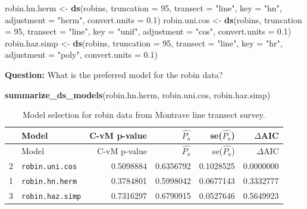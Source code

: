 \documentclass[10pt,a4paper]{tufte-handout}
\newenvironment{Shaded}{\begin{snugshade}}{\end{snugshade}}
\newcommand{\DataTypeTok}[1]{\textcolor[rgb]{0.13,0.29,0.53}{#1}}
\newcommand{\DecValTok}[1]{\textcolor[rgb]{0.00,0.00,0.81}{#1}}
\newcommand{\FloatTok}[1]{\textcolor[rgb]{0.00,0.00,0.81}{#1}}
\newcommand{\KeywordTok}[1]{\textcolor[rgb]{0.13,0.29,0.53}{\textbf{#1}}}
\newcommand{\NormalTok}[1]{#1}
\newcommand{\StringTok}[1]{\textcolor[rgb]{0.31,0.60,0.02}{#1}}
\begin{document}
\begin{Shaded}
\begin{Highlighting}[]
\NormalTok{robin.hn.herm <-}\StringTok{ }\KeywordTok{ds}\NormalTok{(robins, }\DataTypeTok{truncation =} \DecValTok{95}\NormalTok{, }\DataTypeTok{transect =} \StringTok{"line"}\NormalTok{, }
    \DataTypeTok{key =} \StringTok{"hn"}\NormalTok{, }\DataTypeTok{adjustment =} \StringTok{"herm"}\NormalTok{, }\DataTypeTok{convert.units =} \FloatTok{0.1}\NormalTok{)}
\NormalTok{robin.uni.cos <-}\StringTok{ }\KeywordTok{ds}\NormalTok{(robins, }\DataTypeTok{truncation =} \DecValTok{95}\NormalTok{, }\DataTypeTok{transect =} \StringTok{"line"}\NormalTok{, }
    \DataTypeTok{key =} \StringTok{"unif"}\NormalTok{, }\DataTypeTok{adjustment =} \StringTok{"cos"}\NormalTok{, }\DataTypeTok{convert.units =} \FloatTok{0.1}\NormalTok{)}
\NormalTok{robin.haz.simp <-}\StringTok{ }\KeywordTok{ds}\NormalTok{(robins, }\DataTypeTok{truncation =} \DecValTok{95}\NormalTok{, }
    \DataTypeTok{transect =} \StringTok{"line"}\NormalTok{, }\DataTypeTok{key =} \StringTok{"hr"}\NormalTok{, }\DataTypeTok{adjustment =} \StringTok{"poly"}\NormalTok{, }
    \DataTypeTok{convert.units =} \FloatTok{0.1}\NormalTok{)}
\end{Highlighting}
\end{Shaded}

\begin{marginfigure}
\textbf{Question:} What is the preferred model for the robin data?
\end{marginfigure}

\begin{Shaded}
\begin{Highlighting}[]
\KeywordTok{summarize_ds_models}\NormalTok{(robin.hn.herm, robin.uni.cos, }
\NormalTok{    robin.haz.simp)}
\end{Highlighting}
\end{Shaded}

\begin{longtable}[]{@{}llrrrr@{}}
\caption{Model selection for robin data from Montrave line transect
survey.}\tabularnewline
\toprule
& Model & C-vM p-value & \(\hat{P_a}\) & se(\(\hat{P_a}\)) &
\(\Delta\)AIC\tabularnewline
\midrule
\endfirsthead
\toprule
& Model & C-vM p-value & \(\hat{P_a}\) & se(\(\hat{P_a}\)) &
\(\Delta\)AIC\tabularnewline
\midrule
\endhead
2 & \texttt{robin.uni.cos} & 0.5098884 & 0.6356792 & 0.1028525 &
0.0000000\tabularnewline
1 & \texttt{robin.hn.herm} & 0.3784801 & 0.5998042 & 0.0677143 &
0.3332777\tabularnewline
3 & \texttt{robin.haz.simp} & 0.7316297 & 0.6790915 & 0.0527646 &
0.5649923\tabularnewline
\bottomrule
\end{longtable}
\end{document}
